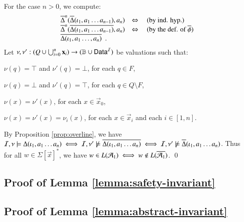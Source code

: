 \documentclass[10pt]{llncs}
\begin{document}
{  For the case $n>0$, we compute:
  \[\begin{array}{lcl}
  \overline{\Delta}^n(\overline{\Delta}(\iota_1,a_1\ldots a_{n-1}),a_n) & \Leftrightarrow & \text{ (by ind. hyp.)} \\
  \overline{\Delta}^n(\overline{\Delta(\iota_1,a_1\ldots a_{n-1})},a_n) & \Leftrightarrow & \text{ (by the def. of $\overline{\phi}$)} \\
  \overline{\Delta(\iota_1,a_1\ldots,a_n)} \enspace.
  \end{array}\]
  Let $\nu,\nu' : (Q \cup \bigcup_{i=0}^n\mathbf x_i) \rightarrow (\mathbb{B}
  \cup \mathsf{Data}^{\mathcal{I}})$ be valuations such that: \begin{compactitem}
  \item $\nu(q) = \top$ and $\nu'(q) = \bot$, for each $q \in F$, 
  \item $\nu(q) = \bot$ and $\nu'(q) = \top$, for each $q \in Q \setminus F$, 
  \item $\nu(x) = \nu'(x)$, for each $x \in \vec{x}_0$, 
  \item $\nu(x) = \nu'(x) = \nu_i(x)$, for each $x \in \vec{x}_i$ and each $i
    \in [1,n]$.
  \end{compactitem}
  By Proposition \ref{prop:overline}, we have $\mathcal{I},\nu \models
  \Delta(\iota_1,a_1 \ldots a_n) \iff \mathcal{I},\nu' \not\models
  \overline{\Delta(\iota_1,a_1 \ldots a_n)} \iff \mathcal{I},\nu' \not\models
  \overline{\Delta}(\iota_1,a_1 \ldots a_n)$. Thus for all $w \in
  \Sigma[\vec{x}]^*$, we have $w \in L(\mathcal{A}_1) \iff w \not\in
  L(\overline{\mathcal{A}_1})$. \qed}

\subsection*{Proof of Lemma \ref{lemma:safety-invariant}}


\subsection*{Proof of Lemma \ref{lemma:abstract-invariant}}
\end{document}
